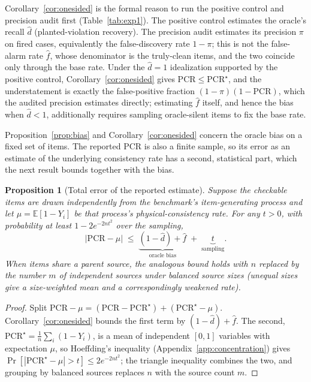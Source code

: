 \documentclass[pdflatex,sn-nature]{sn-jnl}
\newtheorem{proposition}{Proposition}
\begin{document}
\noindent Corollary~\ref{cor:onesided} is the formal reason to run the positive control
and precision audit first (Table~\ref{tab:exp1}). The positive control estimates the
oracle's recall $\hat d$ (planted-violation recovery). The precision audit estimates its
precision $\pi$ on fired cases, equivalently the false-discovery rate $1-\pi$; this is not
the false-alarm rate $\hat f$, whose denominator is the truly-clean items, and the two
coincide only through the base rate. Under the $\hat d=1$ idealization supported by the
positive control, Corollary~\ref{cor:onesided} gives $\mathrm{PCR}\le\mathrm{PCR}^\star$,
and the understatement is exactly the false-positive fraction $(1-\pi)(1-\mathrm{PCR})$, which the
audited precision estimates directly; estimating $\hat f$ itself, and hence the bias when
$\hat d<1$, additionally requires sampling oracle-silent items to fix the base rate.

Proposition~\ref{prop:bias} and Corollary~\ref{cor:onesided} concern the oracle bias on
a fixed set of items. The reported PCR is also a finite sample, so its error as an
estimate of the underlying consistency rate has a second, statistical part, which the
next result bounds together with the bias.

\begin{proposition}[Total error of the reported estimate]\label{prop:total}
Suppose the checkable items are drawn independently from the benchmark's item-generating
process and let $\mu=\mathbb{E}[1-Y_i]$ be that process's physical-consistency rate. For
any $t>0$, with probability at least $1-2e^{-2nt^2}$ over the sampling,
\begin{equation*}
|\mathrm{PCR}-\mu|\;\le\;\underbrace{(1-\hat d)+\hat f}_{\text{oracle bias}}\;+\;\underbrace{t}_{\text{sampling}} .
\end{equation*}
When items share a parent source, the analogous bound holds with $n$ replaced by the
number $m$ of independent sources under balanced source sizes (unequal sizes give a
size-weighted mean and a correspondingly weakened rate).
\end{proposition}
\begin{proof}
Split $\mathrm{PCR}-\mu=(\mathrm{PCR}-\mathrm{PCR}^\star)+(\mathrm{PCR}^\star-\mu)$.
Corollary~\ref{cor:onesided} bounds the first term by $(1-\hat d)+\hat f$. The second,
$\mathrm{PCR}^\star=\frac1n\sum_i(1-Y_i)$, is a mean of independent $[0,1]$ variables with
expectation $\mu$, so Hoeffding's inequality (Appendix~\ref{app:concentration}) gives
$\Pr[|\mathrm{PCR}^\star-\mu|>t]\le 2e^{-2nt^2}$; the triangle inequality combines the two,
and grouping by balanced sources replaces $n$ with the source count $m$.
\end{proof}
\end{document}
